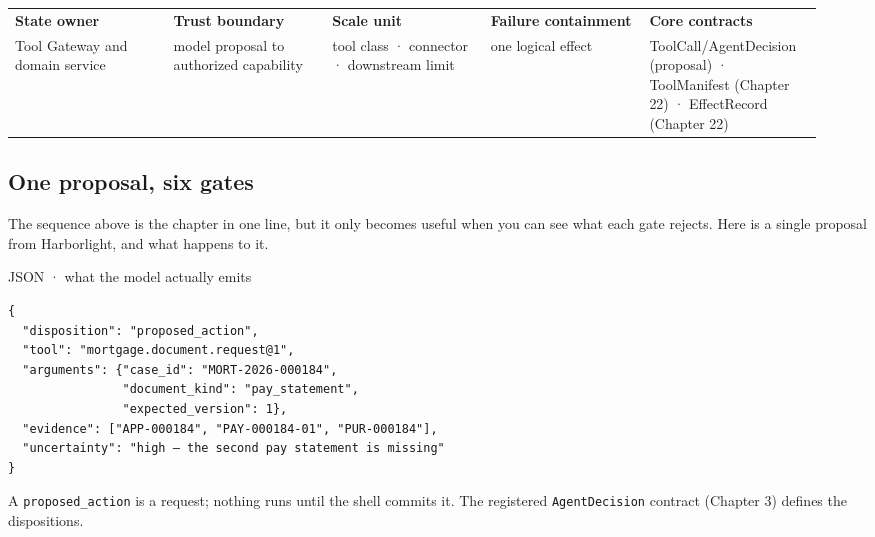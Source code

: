 
\BookTableStart
\fontsize{7.2}{9}\selectfont
\begin{tabular}{@{}Y{0.1880\linewidth}Y{0.1880\linewidth}Y{0.1880\linewidth}Y{0.1880\linewidth}Y{0.1880\linewidth}@{}}
\color{white}\bfseries \textbf{State owner} & \color{white}\bfseries \textbf{Trust boundary} & \color{white}\bfseries \textbf{Scale unit} & \color{white}\bfseries \textbf{Failure containment} & \color{white}\bfseries \textbf{Core contracts} \\
Tool Gateway and domain service & model proposal to authorized capability & tool class · connector · downstream limit & one logical effect & ToolCall/AgentDecision (proposal) · ToolManifest (Chapter 22) · EffectRecord (Chapter 22) \\
\end{tabular}
\BookTableEnd

\subsection{One proposal, six gates}

The sequence above is the chapter in one line, but it only becomes useful when you can see what each gate rejects. Here is a single proposal from Harborlight, and what happens to it.\par

JSON · what the model actually emits\par

\needspace{102.8pt}
\begin{lstlisting}[style=bookcode,title={JSON},language=bookjson]
{
  "disposition": "proposed_action",
  "tool": "mortgage.document.request@1",
  "arguments": {"case_id": "MORT-2026-000184",
                "document_kind": "pay_statement",
                "expected_version": 1},
  "evidence": ["APP-000184", "PAY-000184-01", "PUR-000184"],
  "uncertainty": "high — the second pay statement is missing"
}
\end{lstlisting}

A \lstinline[style=bookinline]!proposed_action! is a request; nothing runs until the shell commits it. The registered \lstinline[style=bookinline]!AgentDecision! contract (Chapter 3) defines the dispositions.\par

